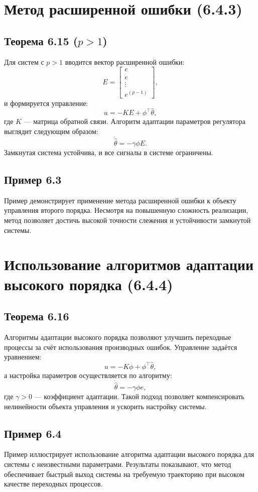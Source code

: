 \documentclass[a4paper,14pt]{extarticle} %
\begin{document}
\section{Метод расширенной ошибки (6.4.3)}

\subsection{Теорема 6.15 (\( p > 1 \))}
Для систем с \( p > 1 \) вводится вектор расширенной ошибки:
\[
E = \begin{bmatrix}
e \\ \dot{e} \\ \vdots \\ e^{(p-1)}
\end{bmatrix},
\]
и формируется управление:
\[
u = -K E + \phi^\top \hat{\theta},
\]
где \( K \) — матрица обратной связи. Алгоритм адаптации параметров регулятора выглядит следующим образом:
\[
\dot{\hat{\theta}} = -\gamma \phi E.
\]
Замкнутая система устойчива, и все сигналы в системе ограничены. 

\subsection{Пример 6.3}
Пример демонстрирует применение метода расширенной ошибки к объекту управления второго порядка. Несмотря на повышенную сложность реализации, метод позволяет достичь высокой точности слежения и устойчивости замкнутой системы.

\section{Использование алгоритмов адаптации высокого порядка (6.4.4)}

\subsection{Теорема 6.16}
Алгоритмы адаптации высокого порядка позволяют улучшить переходные процессы за счёт использования производных ошибок. Управление задаётся уравнением:
\[
u = -K \phi + \phi^\top \hat{\theta},
\]
а настройка параметров осуществляется по алгоритму:
\[
\dot{\hat{\theta}} = -\gamma \phi e,
\]
где \( \gamma > 0 \) — коэффициент адаптации. Такой подход позволяет компенсировать нелинейности объекта управления и ускорить настройку системы.

\subsection{Пример 6.4}
Пример иллюстрирует использование алгоритма адаптации высокого порядка для системы с неизвестными параметрами. Результаты показывают, что метод обеспечивает быстрый выход системы на требуемую траекторию при высоком качестве переходных процессов.
\end{document}
